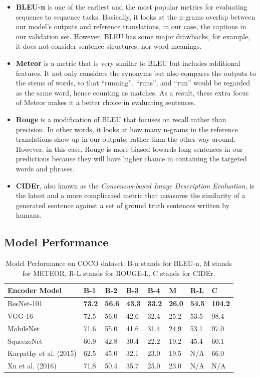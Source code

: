 \documentclass{article}
\begin{document}
\begin{itemize}
    \item \textbf{BLEU-n} is one of the earliest and the most popular metrics for evaluating sequence to sequence tasks. Basically, it looks at the n-grams overlap between our model’s outputs and reference translations, in our case, the captions in our validation set. However, BLEU has some major drawbacks, for example, it does not consider sentence structures, nor word meanings.
    \item \textbf{Meteor} is a metric that is very similar to BLEU but includes additional features. It not only considers the synonyms but also compares the outputs to the stems of words, so that “running”, “runs”, and “run” would be regarded as the same word, hence counting as matches. As a result, these extra focus of Meteor makes it a better choice in evaluating sentences.
    \item \textbf{Rouge} is a modification of BLEU that focuses on recall rather than precision. In other words, it looks at how many n-grams in the reference translations show up in our outputs, rather than the other way around. However, in this case, Rouge is more biased towards long sentences in our predictions because they will have higher chance in containing the targeted words and phrases.
    \item \textbf{CIDEr}, also known as the \textit{Consensus-based Image Description Evaluation}, is the latest and a more complicated metric that measures the similarity of a generated sentence against a set of ground truth sentences written by humans. 
\end{itemize}

\subsection{Model Performance}
\begin{table}[!htbp]
\centering
  \caption{Model Performance on COCO dataset: B-n stands for BLEU-n, M stands for METEOR, R-L stands for ROUGE-L, C stands for CIDEr.}
  \label{model-table}
  \centering
  \begin{tabular}{llllllll}
    \toprule
    Encoder Model & B-1 & B-2 & B-3 & B-4 & M & R-L & C \\
    \midrule
    ResNet-101 & \textbf{73.2} & \textbf{56.6} & \textbf{43.3} & \textbf{33.2} & \textbf{26.0} & \textbf{54.5} & \textbf{104.2}\\
    VGG-16 & 72.5 & 56.0 & 42.6 & 32.4 & 25.2 & 53.5 & 98.4\\
    MobileNet & 71.6 & 55.0 & 41.6 & 31.4 & 24.9 & 53.1 & 97.0\\
    SqueezeNet & 60.9 & 42.8 & 30.4 & 22.2 & 19.2 & 45.4 & 60.1\\
    \midrule
    Karpathy et al. (2015) & 62.5 & 45.0 & 32.1 & 23.0 & 19.5 & N/A & 66.0\\
    Xu et al. (2016) & 71.8 & 50.4 & 35.7 & 25.0 & 23.0 & N/A & N/A\\
    \bottomrule
  \end{tabular}
\end{table}
\end{document}
